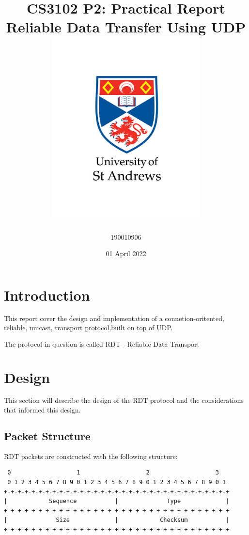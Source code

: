 \documentclass[12pt]{article}
\title{
{CS3102 P2: Practical Report}\\
{\large Reliable Data Transfer Using UDP}\\
{\includegraphics[width=80mm]{university-logo.png}}
}
\author{190010906}
\date{01 April 2022}
\begin{document}
\maketitle

\section{Introduction}

This report cover the design and implementation of a connetion-oritented, reliable, unicast, transport protocol,built on top of UDP.

The protocol in question is called RDT - Reliable Data Transport

\section{Design}

This section will describe the design of the RDT protocol and the considerations that informed this design.

\subsection{Packet Structure}

RDT packets are constructed with the following structure:

\begin{verbatim}
 0                   1                   2                   3  
 0 1 2 3 4 5 6 7 8 9 0 1 2 3 4 5 6 7 8 9 0 1 2 3 4 5 6 7 8 9 0 1
+-+-+-+-+-+-+-+-+-+-+-+-+-+-+-+-+-+-+-+-+-+-+-+-+-+-+-+-+-+-+-+-+
|            Sequence           |              Type             |
+-+-+-+-+-+-+-+-+-+-+-+-+-+-+-+-+-+-+-+-+-+-+-+-+-+-+-+-+-+-+-+-+
|              Size             |            Checksum           |
+-+-+-+-+-+-+-+-+-+-+-+-+-+-+-+-+-+-+-+-+-+-+-+-+-+-+-+-+-+-+-+-+
\end{verbatim}
\end{document}
